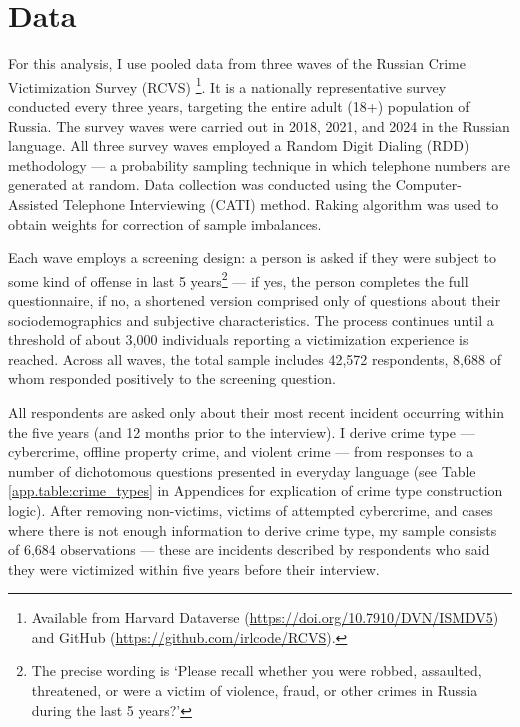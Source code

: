 \documentclass[]{interact}
\theoremstyle{plain}%
\theoremstyle{definition}
\theoremstyle{remark}
\newcommand\citep{\parencite}
\begin{document}
	\section*{Data}
	\label{sec:data}
	
	For this analysis, I use pooled data from three waves of the Russian Crime Victimization Survey (RCVS) \citep{kuchakov2026rcvs}\footnote{Available from Harvard Dataverse %
	(\url{https://doi.org/10.7910/DVN/ISMDV5}) and GitHub (\url{https://github.com/irlcode/RCVS}).}. It is a nationally representative survey conducted every three years, targeting the entire adult (18+) population of Russia. The survey waves were carried out in 2018, 2021, and 2024 in the Russian language. All three survey waves employed a Random Digit Dialing (RDD) methodology --- a probability sampling technique in which telephone numbers are generated at random. Data collection was conducted using the Computer-Assisted Telephone Interviewing (CATI) method. Raking algorithm was used to obtain weights for correction of sample imbalances.
	
	Each wave employs a screening design: a person is asked if they were subject to some kind of offense in last 5 years\footnote{The precise wording is `Please recall whether you were robbed, assaulted, threatened, or were a victim of violence, fraud, or other crimes in Russia during the last 5 years?'} --- if yes, the person completes the full questionnaire, if no, a shortened version comprised only of questions about their sociodemographics and subjective characteristics. The process continues until a threshold of about 3,000 individuals reporting a victimization experience is reached. Across all waves, the total sample includes 42,572 respondents, 8,688 of whom responded positively to the screening question.
	
	All respondents are asked only about their most recent incident occurring within the five years (and 12 months prior to the interview). I derive crime type --- cybercrime, offline property crime, and violent crime --- from responses to a number of dichotomous questions presented in everyday language (see Table \ref{app.table:crime_types} in Appendices for explication of crime type construction logic). After removing non-victims, victims of attempted cybercrime, and cases where there is not enough information to derive crime type, my sample consists of 6,684 observations --- these are incidents described by respondents who said they were victimized within five years before their interview.
	
\end{document}
